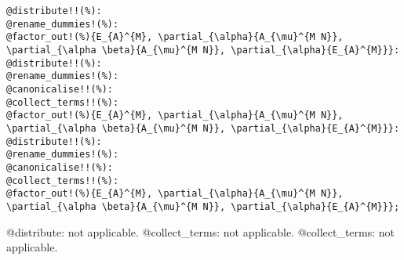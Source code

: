 \documentclass[11pt]{article}
\begin{document}
{\color[named]{Blue}\begin{verbatim}
@distribute!!(%):
@rename_dummies!(%):
@factor_out!(%){E_{A}^{M}, \partial_{\alpha}{A_{\mu}^{M N}}, \partial_{\alpha \beta}{A_{\mu}^{M N}}, \partial_{\alpha}{E_{A}^{M}}}:
@distribute!!(%):
@rename_dummies!(%):
@canonicalise!!(%):
@collect_terms!!(%):
@factor_out!(%){E_{A}^{M}, \partial_{\alpha}{A_{\mu}^{M N}}, \partial_{\alpha \beta}{A_{\mu}^{M N}}, \partial_{\alpha}{E_{A}^{M}}}:
@distribute!!(%):
@rename_dummies!(%):
@canonicalise!!(%):
@collect_terms!!(%):
@factor_out!(%){E_{A}^{M}, \partial_{\alpha}{A_{\mu}^{M N}}, \partial_{\alpha \beta}{A_{\mu}^{M N}}, \partial_{\alpha}{E_{A}^{M}}};
\end{verbatim}}
@distribute: not applicable.
@collect\_terms: not applicable.
@collect\_terms: not applicable.
\end{document}
